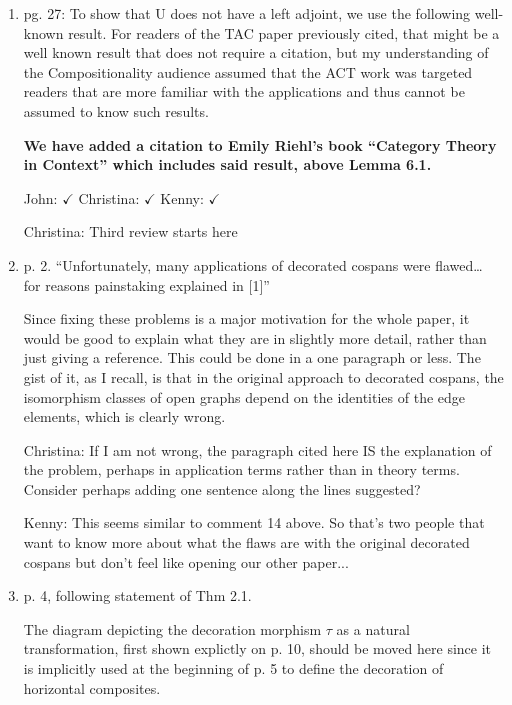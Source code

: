 \documentclass[reqno]{amsart}
\def\chris{\color{purple} Christina: }
\def\john{\color{red} John: }
\def\kenny{\color{blue} Kenny: }
\begin{document}
\begin{enumerate}
{\kenny Actually, we do talk about the flaws a bit more in the middle of page 21 when we're setting up the example of open graphs for Theorem 2.2.}

\item pg. 27: To show that U does not have a left adjoint, we use the following well-known result. For readers of the TAC paper previously cited, 
that might 
be a well known result that does not require a citation, but my understanding of the Compositionality audience assumed that the ACT work was targeted 
readers that are more familiar with the applications and thus cannot be assumed to know such results.

{\bf We have added a citation to Emily Riehl's book ``Category Theory in Context'' which includes said result, above Lemma 6.1.}  


{\john $\checkmark$} {\chris $\checkmark$} {\kenny $\checkmark$}

{\chris Third review starts here}
\item p. 2. “Unfortunately, many applications of decorated cospans were flawed… for reasons painstaking explained in [1]”

Since fixing these problems is a major motivation for the whole paper, it would be good to explain what they are in slightly more detail, rather than 
just giving a reference. This could be done in a one paragraph or less. The gist of it, as I recall, is that in the original approach to decorated 
cospans, the isomorphism classes of open graphs depend on the identities of the edge elements, which is clearly wrong.

{\chris If I am not wrong, the paragraph cited here IS the explanation of the problem, perhaps in application terms rather than in theory terms. 
Consider perhaps adding one sentence along the lines suggested?}

{\kenny This seems similar to comment 14 above. So that's two people that want to know more about what the flaws are with the original decorated cospans but don't feel like opening our other paper...}

\item p. 4, following statement of Thm 2.1.

The diagram depicting the decoration morphism $\tau$ as a natural transformation, first shown explictly on p. 10, should be moved here since it is 
implicitly used at the beginning of p. 5 to define the decoration of horizontal composites.


\end{enumerate}
\end{document}
